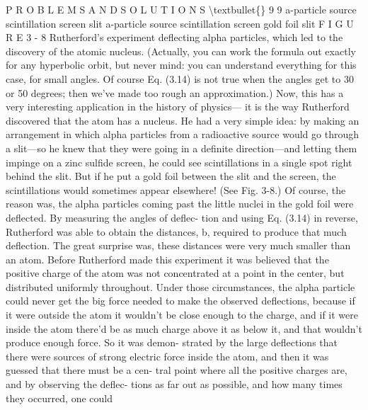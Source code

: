 \documentclass[10pt,oneside]{article}
\begin{document}
P R O B L E M S  A N D  S O L U T I O N S \textbackslash{}textbullet\{\} 9 9 a-particle source scintillation screen slit a-particle source scintillation screen gold foil slit F I G U R E  3 - 8 Rutherford’s experiment deflecting alpha particles, which led to the discovery of the atomic nucleus. (Actually, you can work the formula out exactly for any hyperbolic orbit, but never mind: you can understand everything for this case, for small angles. Of course Eq. (3.14) is not true when the angles get to 30 or 50 degrees; then we’ve made too rough an approximation.) Now, this has a very interesting application in the history of physics--- it is the way Rutherford discovered that the atom has a nucleus. He had a very simple idea: by making an arrangement in which alpha particles from a radioactive source would go through a slit---so he knew that they were going in a definite direction---and letting them impinge on a zinc sulfide screen, he could see scintillations in a single spot right behind the slit. But if he put a gold foil between the slit and the screen, the scintillations would sometimes appear elsewhere! (See Fig. 3-8.) Of course, the reason was, the alpha particles coming past the little nuclei in the gold foil were deflected. By measuring the angles of deflec- tion and using Eq. (3.14) in reverse, Rutherford was able to obtain the distances, b, required to produce that much deflection. The great surprise was, these distances were very much smaller than an atom. Before Rutherford made this experiment it was believed that the positive charge of the atom was not concentrated at a point in the center, but distributed uniformly throughout. Under those circumstances, the alpha particle could never get the big force needed to make the observed deflections, because if it were outside the atom it wouldn’t be close enough to the charge, and if it were inside the atom there’d be as much charge above it as below it, and that wouldn’t produce enough force. So it was demon- strated by the large deflections that there were sources of strong electric force inside the atom, and then it was guessed that there must be a cen- tral point where all the positive charges are, and by observing the deflec- tions as far out as possible, and how many times they occurred, one could\par
\end{document}

